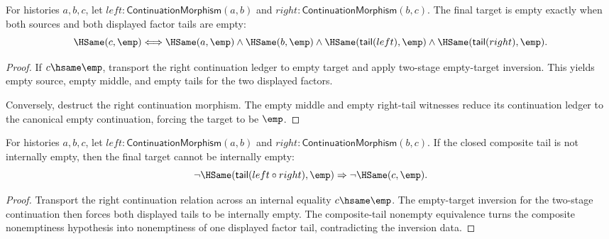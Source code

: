 \begin{theorem}
\label{thm:continuation-morphism-comp-target-empty-iff}
For histories $a,b,c$, let
$left:\mathsf{ContinuationMorphism}(a,b)$ and
$right:\mathsf{ContinuationMorphism}(b,c)$. The final target is empty exactly
when both sources and both displayed factor tails are empty:
$$
\HSame(c,\emp)\Longleftrightarrow
\HSame(a,\emp)\land\HSame(b,\emp)\land
\HSame(\mathsf{tail}(left),\emp)\land
\HSame(\mathsf{tail}(right),\emp).
$$
\end{theorem}
\begin{proof}
If $c\hsame\emp$, transport the right continuation ledger to empty target and
apply two-stage empty-target inversion. This yields empty source, empty
middle, and empty tails for the two displayed factors.

Conversely, destruct the right continuation morphism. The empty middle and
empty right-tail witnesses reduce its continuation ledger to the canonical
empty continuation, forcing the target to be $\emp$.
\end{proof}

\begin{theorem}
\label{thm:category-continuation-morphism-comp-tail-nonempty-target-not-empty}
For histories $a,b,c$, let
$left:\mathsf{ContinuationMorphism}(a,b)$ and
$right:\mathsf{ContinuationMorphism}(b,c)$. If the closed composite tail is
not internally empty, then the final target cannot be internally empty:
$$
\neg\HSame(\mathsf{tail}(left\circ right),\emp)
\Rightarrow
\neg\HSame(c,\emp).
$$
\end{theorem}
\begin{proof}
Transport the right continuation relation across an internal equality
$c\hsame\emp$. The empty-target inversion for the two-stage continuation then
forces both displayed tails to be internally empty. The composite-tail
nonempty equivalence turns the composite nonemptiness hypothesis into
nonemptiness of one displayed factor tail, contradicting the inversion data.
\end{proof}

